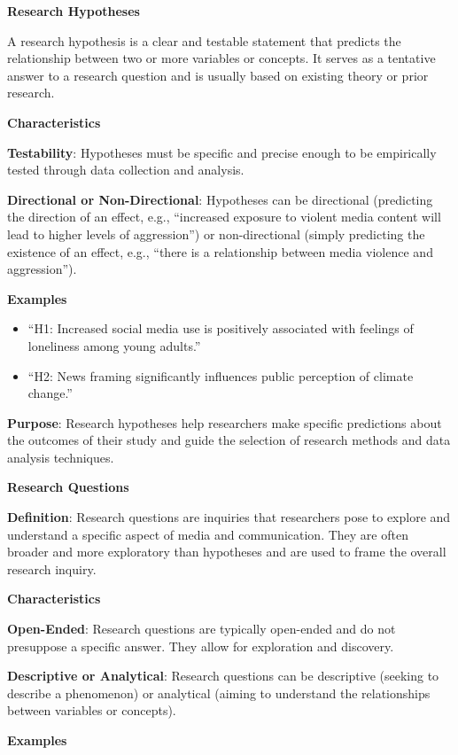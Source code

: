 \documentclass[
]{book}
\begin{document}
\textbf{Research Hypotheses}

A research hypothesis is a clear and testable statement that predicts the relationship between two or more variables or concepts. It serves as a tentative answer to a research question and is usually based on existing theory or prior research.

\textbf{Characteristics}

\textbf{Testability}: Hypotheses must be specific and precise enough to be empirically tested through data collection and analysis.

\textbf{Directional or Non-Directional}: Hypotheses can be directional (predicting the direction of an effect, e.g., ``increased exposure to violent media content will lead to higher levels of aggression'') or non-directional (simply predicting the existence of an effect, e.g., ``there is a relationship between media violence and aggression'').

\textbf{Examples}

\begin{itemize}
\item
  ``H1: Increased social media use is positively associated with feelings of loneliness among young adults.''
\item
  ``H2: News framing significantly influences public perception of climate change.''
\end{itemize}

\textbf{Purpose}: Research hypotheses help researchers make specific predictions about the outcomes of their study and guide the selection of research methods and data analysis techniques.

\textbf{Research Questions}

\textbf{Definition}: Research questions are inquiries that researchers pose to explore and understand a specific aspect of media and communication. They are often broader and more exploratory than hypotheses and are used to frame the overall research inquiry.

\textbf{Characteristics}

\textbf{Open-Ended}: Research questions are typically open-ended and do not presuppose a specific answer. They allow for exploration and discovery.

\textbf{Descriptive or Analytical}: Research questions can be descriptive (seeking to describe a phenomenon) or analytical (aiming to understand the relationships between variables or concepts).

\textbf{Examples}
\end{document}
